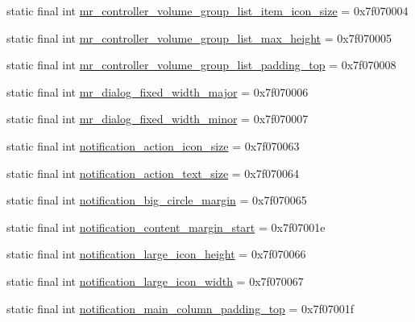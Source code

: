 \begin{CompactItemize}
\item 
static final int \hyperlink{classandroid_1_1support_1_1transition_1_1_r_1_1dimen_12cda35d74633553c5548841f85f998c}{mr\_\-controller\_\-volume\_\-group\_\-list\_\-item\_\-icon\_\-size} = 0x7f070004
\item 
static final int \hyperlink{classandroid_1_1support_1_1transition_1_1_r_1_1dimen_7c79ee3bddbc233aad829b1d8cefba81}{mr\_\-controller\_\-volume\_\-group\_\-list\_\-max\_\-height} = 0x7f070005
\item 
static final int \hyperlink{classandroid_1_1support_1_1transition_1_1_r_1_1dimen_3a2718ea17b185975dd3658d188c6050}{mr\_\-controller\_\-volume\_\-group\_\-list\_\-padding\_\-top} = 0x7f070008
\item 
static final int \hyperlink{classandroid_1_1support_1_1transition_1_1_r_1_1dimen_b18822a20b71a9a7ebfd7cc3db01123c}{mr\_\-dialog\_\-fixed\_\-width\_\-major} = 0x7f070006
\item 
static final int \hyperlink{classandroid_1_1support_1_1transition_1_1_r_1_1dimen_86fcfe23d08a57e4cbf7b0bd8a84a0ad}{mr\_\-dialog\_\-fixed\_\-width\_\-minor} = 0x7f070007
\item 
static final int \hyperlink{classandroid_1_1support_1_1transition_1_1_r_1_1dimen_3a20788b34a3094d04d54f4c8399f457}{notification\_\-action\_\-icon\_\-size} = 0x7f070063
\item 
static final int \hyperlink{classandroid_1_1support_1_1transition_1_1_r_1_1dimen_3e28288fa0cc20b3ca0f683537226d18}{notification\_\-action\_\-text\_\-size} = 0x7f070064
\item 
static final int \hyperlink{classandroid_1_1support_1_1transition_1_1_r_1_1dimen_e093fa81070ee5e55858a4e69e52a3c7}{notification\_\-big\_\-circle\_\-margin} = 0x7f070065
\item 
static final int \hyperlink{classandroid_1_1support_1_1transition_1_1_r_1_1dimen_31541985a458c512f03efba945f8022c}{notification\_\-content\_\-margin\_\-start} = 0x7f07001e
\item 
static final int \hyperlink{classandroid_1_1support_1_1transition_1_1_r_1_1dimen_de54f2b84584ec437b347f73c44f1f1c}{notification\_\-large\_\-icon\_\-height} = 0x7f070066
\item 
static final int \hyperlink{classandroid_1_1support_1_1transition_1_1_r_1_1dimen_6dd276edf09b5561b551d9b3007a3ee0}{notification\_\-large\_\-icon\_\-width} = 0x7f070067
\item 
static final int \hyperlink{classandroid_1_1support_1_1transition_1_1_r_1_1dimen_ac2341def0c8d843ea8e577c12d673b3}{notification\_\-main\_\-column\_\-padding\_\-top} = 0x7f07001f

\end{CompactItemize}
